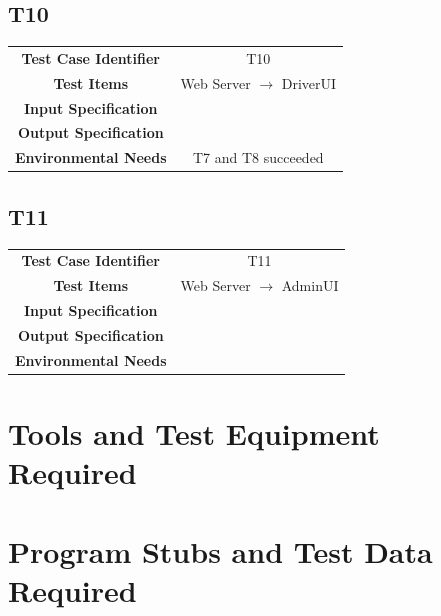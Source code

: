 \documentclass{article}
\begin{document}
\subsection{T10}
\begin{adjustbox}{width=1.2\textwidth}	
	\begin{tabular}{*{2}{c}}
		\toprule
		\midrule
		\textbf{Test Case Identifier} & T10\\
		\textbf{Test Items} & Web Server $\rightarrow$ DriverUI\\
		\textbf{Input Specification} & \\
		\textbf{Output Specification} & \\ %
		\textbf{Environmental Needs} & T7 and T8 succeeded\\
		\bottomrule
	\end{tabular}
\end{adjustbox}
\subsection{T11}
\begin{adjustbox}{width=1.2\textwidth}	
	\begin{tabular}{*{2}{c}}
		\toprule
		\midrule
		\textbf{Test Case Identifier} & T11\\
		\textbf{Test Items} & Web Server $\rightarrow$ AdminUI\\
		\textbf{Input Specification} & \\
		\textbf{Output Specification} & \\
		\textbf{Environmental Needs} & \\
		\bottomrule
	\end{tabular}
\end{adjustbox}
\section{Tools and Test Equipment Required}
\section{Program Stubs and Test Data Required}
\end{document}
